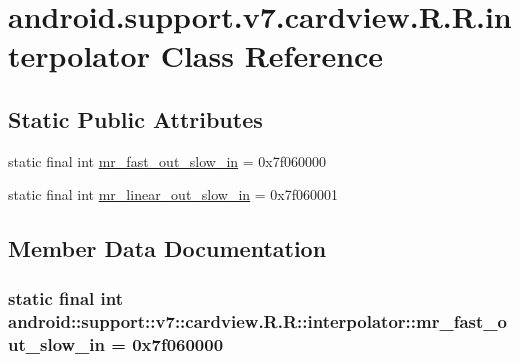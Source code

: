 \hypertarget{classandroid_1_1support_1_1v7_1_1cardview_1_1_r_1_1interpolator}{
\section{android.support.v7.cardview.R.R.interpolator Class Reference}
\label{classandroid_1_1support_1_1v7_1_1cardview_1_1_r_1_1interpolator}
}
\subsection*{Static Public Attributes}
\begin{CompactItemize}
\item 
static final int \hyperlink{classandroid_1_1support_1_1v7_1_1cardview_1_1_r_1_1interpolator_9fc121f6ad133f32b49dbab2195d1acb}{mr\_\-fast\_\-out\_\-slow\_\-in} = 0x7f060000
\item 
static final int \hyperlink{classandroid_1_1support_1_1v7_1_1cardview_1_1_r_1_1interpolator_a96184caaf87dd672c889d8949599fd2}{mr\_\-linear\_\-out\_\-slow\_\-in} = 0x7f060001
\end{CompactItemize}


\subsection{Member Data Documentation}
\hypertarget{classandroid_1_1support_1_1v7_1_1cardview_1_1_r_1_1interpolator_9fc121f6ad133f32b49dbab2195d1acb}{
\subsubsection[{mr\_\-fast\_\-out\_\-slow\_\-in}]{\setlength{\rightskip}{0pt plus 5cm}static final int android::support::v7::cardview.R.R::interpolator::mr\_\-fast\_\-out\_\-slow\_\-in = 0x7f060000}}
\label{classandroid_1_1support_1_1v7_1_1cardview_1_1_r_1_1interpolator_9fc121f6ad133f32b49dbab2195d1acb}


